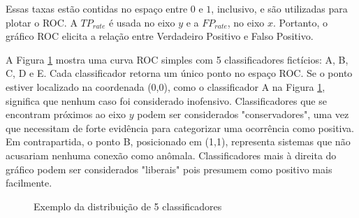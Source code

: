 Essas taxas estão contidas no espaço entre $0$ e $1$, inclusivo, e são utilizadas para plotar o ROC. A $TP_{rate}$ é
usada no eixo $y$ e a $FP_{rate}$, no eixo $x$. Portanto, o gráfico ROC elicita a relação entre Verdadeiro Positivo e
Falso Positivo.
\par A Figura \ref{fig:roc} mostra uma curva ROC simples com 5 classificadores fictícios: A, B, C, D e E. Cada classificador
retorna um único ponto no espaço ROC. Se o ponto estiver localizado na coordenada (0,0), como o classificador A na
Figura \ref{fig:roc}, significa que nenhum caso foi considerado inofensivo. Classificadores que se encontram próximos ao eixo
$y$ podem ser considerados "conservadores", uma vez que necessitam de forte evidência para categorizar uma ocorrência
como positiva. Em contrapartida, o ponto B, posicionado em (1,1), representa sistemas que não acusariam nenhuma
conexão como anômala. Classificadores mais à direita do gráfico podem ser considerados "liberais" pois presumem como
positivo mais facilmente.

\begin{figure}
  \centering
    \caption{Exemplo da distribuição de 5 classificadores}
    \label{fig:roc}
\end{figure}

